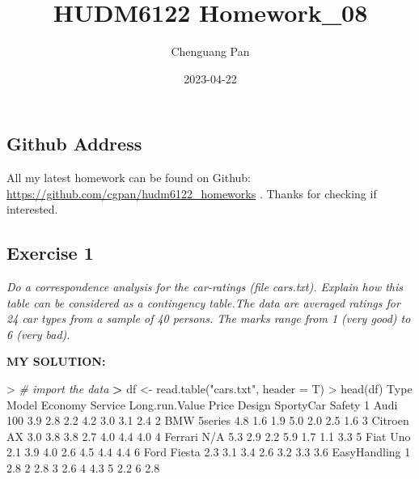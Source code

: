 \documentclass[
]{article}
\title{HUDM6122 Homework\_08}
\author{Chenguang Pan}
\date{2023-04-22}
\newenvironment{Shaded}{\begin{snugshade}}{\end{snugshade}}
\newcommand{\AttributeTok}[1]{\textcolor[rgb]{0.77,0.63,0.00}{#1}}
\newcommand{\CommentTok}[1]{\textcolor[rgb]{0.56,0.35,0.01}{\textit{#1}}}
\newcommand{\DecValTok}[1]{\textcolor[rgb]{0.00,0.00,0.81}{#1}}
\newcommand{\ErrorTok}[1]{\textcolor[rgb]{0.64,0.00,0.00}{\textbf{#1}}}
\newcommand{\FloatTok}[1]{\textcolor[rgb]{0.00,0.00,0.81}{#1}}
\newcommand{\FunctionTok}[1]{\textcolor[rgb]{0.00,0.00,0.00}{#1}}
\newcommand{\NormalTok}[1]{#1}
\newcommand{\OtherTok}[1]{\textcolor[rgb]{0.56,0.35,0.01}{#1}}
\newcommand{\SpecialCharTok}[1]{\textcolor[rgb]{0.00,0.00,0.00}{#1}}
\newcommand{\StringTok}[1]{\textcolor[rgb]{0.31,0.60,0.02}{#1}}
\begin{document}
\maketitle

\hypertarget{github-address}{%
\subsection{Github Address}\label{github-address}}

All my latest homework can be found on Github:
\url{https://github.com/cgpan/hudm6122_homeworks} . Thanks for checking
if interested.

\hypertarget{exercise-1}{%
\subsection{Exercise 1}\label{exercise-1}}

\emph{Do a correspondence analysis for the car-ratings (file cars.txt).
Explain how this table can be considered as a contingency table.The data
are averaged ratings for 24 car types from a sample of 40 persons. The
marks range from 1 (very good) to 6 (very bad).}

\textbf{MY SOLUTION:}

\begin{Shaded}
\begin{Highlighting}[]
\SpecialCharTok{\textgreater{}} \CommentTok{\# import the data}
\ErrorTok{\textgreater{}}\NormalTok{ df }\OtherTok{\textless{}{-}} \FunctionTok{read.table}\NormalTok{(}\StringTok{"cars.txt"}\NormalTok{, }\AttributeTok{header =}\NormalTok{ T)}
\SpecialCharTok{\textgreater{}} \FunctionTok{head}\NormalTok{(df)}
\NormalTok{     Type   Model Economy Service Long.run.Value Price Design SportyCar Safety}
\DecValTok{1}\NormalTok{    Audi     }\DecValTok{100}     \FloatTok{3.9}     \FloatTok{2.8}            \FloatTok{2.2}   \FloatTok{4.2}    \FloatTok{3.0}       \FloatTok{3.1}    \FloatTok{2.4}
\DecValTok{2}\NormalTok{     BMW 5series     }\FloatTok{4.8}     \FloatTok{1.6}            \FloatTok{1.9}   \FloatTok{5.0}    \FloatTok{2.0}       \FloatTok{2.5}    \FloatTok{1.6}
\DecValTok{3}\NormalTok{ Citroen      AX     }\FloatTok{3.0}     \FloatTok{3.8}            \FloatTok{3.8}   \FloatTok{2.7}    \FloatTok{4.0}       \FloatTok{4.4}    \FloatTok{4.0}
\DecValTok{4}\NormalTok{ Ferrari     N}\SpecialCharTok{/}\NormalTok{A     }\FloatTok{5.3}     \FloatTok{2.9}            \FloatTok{2.2}   \FloatTok{5.9}    \FloatTok{1.7}       \FloatTok{1.1}    \FloatTok{3.3}
\DecValTok{5}\NormalTok{    Fiat     Uno     }\FloatTok{2.1}     \FloatTok{3.9}            \FloatTok{4.0}   \FloatTok{2.6}    \FloatTok{4.5}       \FloatTok{4.4}    \FloatTok{4.4}
\DecValTok{6}\NormalTok{    Ford  Fiesta     }\FloatTok{2.3}     \FloatTok{3.1}            \FloatTok{3.4}   \FloatTok{2.6}    \FloatTok{3.2}       \FloatTok{3.3}    \FloatTok{3.6}
\NormalTok{  EasyHandling}
\DecValTok{1}          \FloatTok{2.8}
\DecValTok{2}          \FloatTok{2.8}
\DecValTok{3}          \FloatTok{2.6}
\DecValTok{4}          \FloatTok{4.3}
\DecValTok{5}          \FloatTok{2.2}
\DecValTok{6}          \FloatTok{2.8}
\end{Highlighting}
\end{Shaded}
\end{document}
